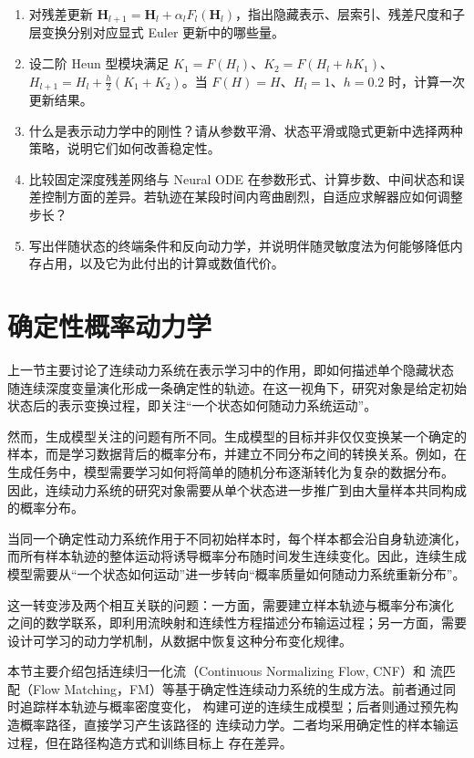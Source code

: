 \begin{exercisebox}
  \begin{enumerate}
    \item 对残差更新 \(\boldsymbol H_{l+1}=\boldsymbol H_l+\alpha_lF_l(\boldsymbol H_l)\)，指出隐藏表示、层索引、残差尺度和子层变换分别对应显式 Euler 更新中的哪些量。
    \item 设二阶 Heun 型模块满足 \(K_1=F(H_l)\)、\(K_2=F(H_l+hK_1)\)、\(H_{l+1}=H_l+\tfrac h2(K_1+K_2)\)。当 \(F(H)=H\)、\(H_l=1\)、\(h=0.2\) 时，计算一次更新结果。
    \item 什么是表示动力学中的刚性？请从参数平滑、状态平滑或隐式更新中选择两种策略，说明它们如何改善稳定性。
    \item 比较固定深度残差网络与 Neural ODE 在参数形式、计算步数、中间状态和误差控制方面的差异。若轨迹在某段时间内弯曲剧烈，自适应求解器应如何调整步长？
    \item 写出伴随状态的终端条件和反向动力学，并说明伴随灵敏度法为何能够降低内存占用，以及它为此付出的计算或数值代价。
  \end{enumerate}
\end{exercisebox}



\section{确定性概率动力学}

上一节主要讨论了连续动力系统在表示学习中的作用，即如何描述单个隐藏状态
随连续深度变量演化形成一条确定性的轨迹。在这一视角下，研究对象是给定初始
状态后的表示变换过程，即关注“一个状态如何随动力系统运动”。

然而，生成模型关注的问题有所不同。生成模型的目标并非仅仅变换某一个确定的
样本，而是学习数据背后的概率分布，并建立不同分布之间的转换关系。例如，在
生成任务中，模型需要学习如何将简单的随机分布逐渐转化为复杂的数据分布。
因此，连续动力系统的研究对象需要从单个状态进一步推广到由大量样本共同构成
的概率分布。

当同一个确定性动力系统作用于不同初始样本时，每个样本都会沿自身轨迹演化，
而所有样本轨迹的整体运动将诱导概率分布随时间发生连续变化。因此，连续生成
模型需要从“一个状态如何运动”进一步转向“概率质量如何随动力系统重新分布”。

这一转变涉及两个相互关联的问题：一方面，需要建立样本轨迹与概率分布演化
之间的数学联系，即利用流映射和连续性方程描述分布输运过程；另一方面，需要
设计可学习的动力学机制，从数据中恢复这种分布变化规律。

本节主要介绍包括连续归一化流（Continuous Normalizing
Flow, CNF）和 流匹配（Flow Matching，FM）等基于确定性连续动力系统的生成方法。前者通过同时追踪样本轨迹与概率密度变化，
构建可逆的连续生成模型；后者则通过预先构造概率路径，直接学习产生该路径的
连续动力学。二者均采用确定性的样本输运过程，但在路径构造方式和训练目标上
存在差异。

